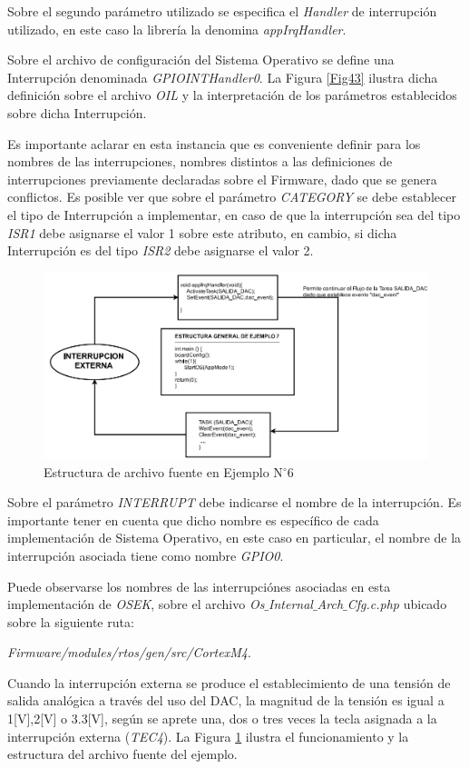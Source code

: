 \documentclass[12pt,letterpaper]{article}
\begin{document}
Sobre el segundo parámetro utilizado se especifica el \textit{Handler} de interrupción utilizado, en este caso la librería la denomina \textit{appIrqHandler}.

Sobre el archivo de configuración del Sistema Operativo se define una Interrupción denominada \textit{GPIOINTHandler0}. La Figura \ref{Fig43} ilustra dicha definición sobre el archivo \textit{OIL} y la interpretación de los parámetros establecidos sobre dicha Interrupción.

Es importante aclarar en esta instancia que es conveniente definir para los nombres de las interrupciones, nombres distintos a las definiciones de interrupciones previamente declaradas sobre el Firmware, dado que se genera conflictos. Es posible ver que sobre el parámetro \textit{CATEGORY} se debe establecer el tipo de Interrupción a implementar, en caso de que la interrupción sea del tipo \textit{ISR1} debe asignarse el valor 1 sobre este atributo, en cambio, si dicha Interrupción es del tipo \textit{ISR2} debe asignarse el valor 2.
\begin{figure}[!h]
\centering
\includegraphics[width=12 cm]{figuras/f37.png}
\caption{Estructura de archivo fuente en Ejemplo N$^{\circ}$6}
\label{estructuraej6}
\end{figure}
Sobre el parámetro \textit{INTERRUPT} debe indicarse el nombre de la interrupción. Es importante tener en cuenta que dicho nombre es específico de cada implementación de Sistema Operativo, en este caso en particular, el nombre de la interrupción asociada tiene como nombre \textit{GPIO0}.

Puede observarse los nombres de las interrupciónes asociadas en esta implementación de \textit{OSEK}, sobre el archivo \textit{Os$\_$Internal$\_$Arch$\_$Cfg.c.php} ubicado sobre la siguiente ruta:

{\footnotesize \textit{Firmware/modules/rtos/gen/src/CortexM4}}.

Cuando la interrupción externa se produce el establecimiento de una tensión de salida analógica a través del uso del DAC, la magnitud de la tensión es igual a 1[V],2[V] o 3.3[V], según se aprete una, dos o tres veces la tecla asignada a la interrupción externa (\textit{TEC4}). La Figura \ref{estructuraej6} ilustra el funcionamiento y la estructura del archivo fuente del ejemplo.
\end{document}
